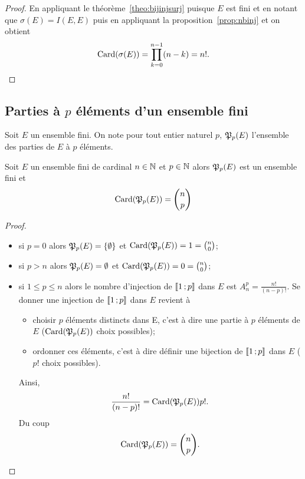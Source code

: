 \begin{proof}
  En appliquant le théorème~\ref{theo:bijinjsurj} puisque $E$ est fini et en notant que $\sigma(E)=I(E,E)$ puis en appliquant la proposition~\ref{prop:nbinj} et on obtient
  \begin{equation}
    \operatorname{Card}(\sigma(E))=\prod_{k=0}^{n-1}(n-k)=n!.
  \end{equation}
\end{proof}

\subsection{Parties à $p$ éléments d'un ensemble fini}

Soit $E$ un ensemble fini. On note pour tout entier naturel $p$, $\mathfrak{P}_p(E)$ l'ensemble des parties de $E$ à $p$ éléments.
\begin{prop}\label{prop:ppartiesfinies}
  Soit $E$ un ensemble fini de cardinal $n\in \mathbb{N}$ et $p \in \mathbb{N}$ alors $\mathfrak{P}_p(E)$ est un ensemble fini et
  \begin{equation}
    \operatorname{Card}(\mathfrak{P}_p(E))=\binom{n}{p}
  \end{equation}
\end{prop}
\begin{proof}
  \begin{itemize}
  \item si $p=0$ alors $\mathfrak{P}_p(E)=\{\emptyset\}$ et $\operatorname{Card}(\mathfrak{P}_p(E))=1=\binom{n}{0}$;
  \item si $p>n$ alors $\mathfrak{P}_p(E)=\emptyset$ et $\operatorname{Card}(\mathfrak{P}_p(E))=0=\binom{n}{0}$;
  \item si $1\leqslant p \leqslant n$ alors le nombre d'injection de $\mathopen{\llbracket}1\mathclose{}\mathpunct{};p\mathclose{\rrbracket}$ dans $E$ est $A_{n}^p=\frac{n!}{(n-p)!}$. Se donner une injection de  $\mathopen{\llbracket}1\mathclose{}\mathpunct{};p\mathclose{\rrbracket}$ dans $E$ revient à
    \begin{itemize}
    \item choisir $p$ éléments distincts dans E, c'est à dire une partie à $p$ éléments de $E$ ($\operatorname{Card}(\mathfrak{P}_p(E))$ choix possibles);
    \item ordonner ces éléments, c'est à dire définir une bijection de $\mathopen{\llbracket}1\mathclose{}\mathpunct{};p\mathclose{\rrbracket}$ dans $E$ ($p!$ choix possibles).
    \end{itemize}
    Ainsi,
    \begin{equation}
      \frac{n!}{(n-p)!}=\operatorname{Card}(\mathfrak{P}_p(E)) p!.
    \end{equation}
    Du coup
    \begin{equation}
      \operatorname{Card}(\mathfrak{P}_p(E))=\binom{n}{p}.
    \end{equation}
  \end{itemize}
\end{proof}
